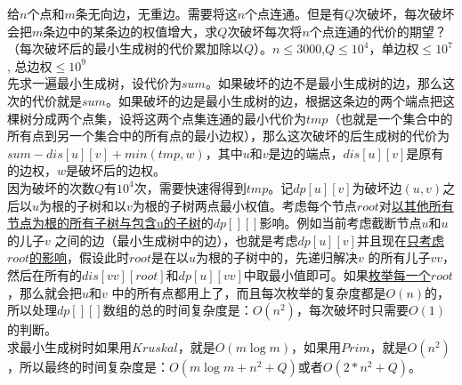 给$n$个点和$m$条无向边，无重边。需要将这$n$个点连通。但是有$Q$次破坏，每次破坏会把$m$条边中的某条边的权值增大，求$Q$次破坏每次将$n$个点连通的代价的期望？（每次破坏后的最小生成树的代价累加除以$Q$）。$n\leq 3000$,$Q\leq 10^4$，单边权$\leq 10^{7}$, 总边权$\leq 10^{9}$ \\


先求一遍最小生成树，设代价为$sum$。如果破坏的边不是最小生成树的边，那么这次的代价就是$sum$。如果破坏的边是最小生成树的边，根据这条边的两个端点把这棵树分成两个点集，设将这两个点集连通的最小代价为$tmp$（也就是一个集合中的所有点到另一个集合中的所有点的最小边权），那么这次破坏的后生成树的代价为$sum-dis[u][v]+min(tmp,w)$，其中$u$和$v$是边的端点，$dis[u][v]$是原有的边权，$w$是破坏后的边权。 \\

因为破坏的次数$Q$有$10^4$次，需要快速得得到$tmp$。记$dp[u][v]$为破坏边$(u,v)$之后以$u$为根的子树和以$v$为根的子树两点最小权值。考虑每个节点$root$对\underline {以其他所有节点为根的所有子树与包含u的子树}的$dp[][]$影响。例如当前考虑截断节点$u$和$u$的儿子$v$ 之间的边（最小生成树中的边），也就是考虑$dp[u][v]$并且现在\underline {只考虑$root$的影响}，假设此时$root$是在以$u$为根的子树中的，先递归解决$v$ 的所有儿子$vv$，然后在所有的$dis[vv][root]$和$dp[u][vv]$中取最小值即可。如果\underline {枚举每一个$root$}，那么就会把$u$和$v$ 中的所有点都用上了，而且每次枚举的复杂度都是$O(n)$的，所以处理$dp[][]$数组的总的时间复杂度是：$O(n^2)$，每次破坏时只需要$O(1)$ 的判断。 \\
 求最小生成树时如果用$Kruskal$，就是$O(m\log m)$，如果用$Prim$，就是$O(n^2)$，所以最终的时间复杂度是：$O(m\log m+n^2+Q)$或者$O(2*n^{2}+Q)$。
